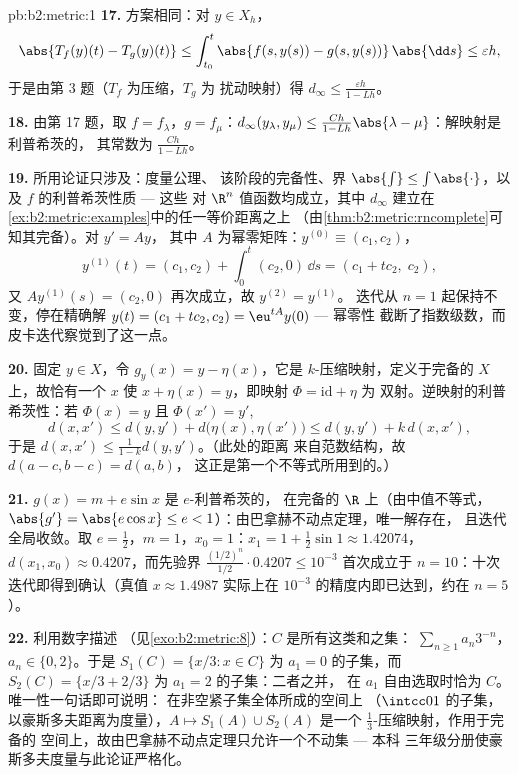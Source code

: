 \begin{solution}{pb:b2:metric:1}
\textbf{17.} 方案相同：对 $y \in X_h$，
\[
\abs{T_f(y)(t) - T_g(y)(t)} \leq \int_{t_0}^t \abs{f(s,y(s)) -
g(s,y(s))}\,\abs{\dd s} \leq \varepsilon h ,
\]
于是由第 3 题（$T_f$ 为压缩，$T_g$ 为
扰动映射）得 $d_\infty \leq \frac{\varepsilon h}{1 - Lh}$。

\textbf{18.} 由第 17 题，取 $f = f_\lambda$，$g =
f_\mu$：$d_\infty(y_\lambda, y_\mu) \leq \frac{Ch}{1 -
Lh}\abs{\lambda - \mu}$：解映射是利普希茨的，
其常数为 $\frac{Ch}{1-Lh}$。

\textbf{19.} 所用论证只涉及：度量公理、
该阶段的完备性、界 $\abs{\int} \leq
\int\abs{\cdot}$，以及 $f$ 的利普希茨性质 --- 这些
对 $\R^n$ 值函数均成立，其中 $d_\infty$ 建立在
\cref{ex:b2:metric:examples}中的任一等价距离之上
（由\cref{thm:b2:metric:rncomplete}可知其完备）。对 $y' = Ay$，
其中 $A$ 为幂零矩阵：$y^{(0)} \equiv (c_1, c_2)$，
\[
y^{(1)}(t) = (c_1, c_2) + \int_0^t (c_2, 0)\,\dd s
= (c_1 + tc_2,\; c_2),
\]
又 $Ay^{(1)}(s) = (c_2, 0)$ 再次成立，故 $y^{(2)} = y^{(1)}$。
迭代从 $n = 1$ 起保持不变，停在精确解
$y(t) = (c_1 + tc_2, c_2) = \eu^{tA}y(0)$ --- 幂零性
截断了指数级数，而皮卡迭代察觉到了这一点。

\textbf{20.} 固定 $y \in X$，令 $g_y(x) = y - \eta(x)$，它是
$k$-压缩映射，定义于完备的 $X$ 上，故恰有一个 $x$
使 $x + \eta(x) = y$，即映射 $\Phi = \mathrm{id} + \eta$ 为
双射。逆映射的利普希茨性：若 $\Phi(x) = y$ 且 $\Phi(x') =
y'$,
\[
d(x, x') \leq d(y, y') + d\bigl(\eta(x), \eta(x')\bigr)
\leq d(y, y') + k\,d(x, x'),
\]
于是 $d(x, x') \leq \frac{1}{1-k}d(y, y')$。（此处的距离
来自范数结构，故 $d(a - c, b - c) = d(a, b)$，
这正是第一个不等式所用到的。）

\textbf{21.} $g(x) = m + e\sin x$ 是 $e$-利普希茨的，
在完备的 $\R$ 上（由中值不等式，$\abs{g'} = \abs{e\cos x}
\leq e < 1$）：由巴拿赫不动点定理，唯一解存在，
且迭代全局收敛。取 $e = \frac12$，$m = 1$，$x_0
= 1$：$x_1 = 1 + \frac12\sin 1 \approx 1.42074$，$d(x_1, x_0)
\approx 0.4207$，而先验界
$\frac{(1/2)^n}{1/2}\cdot 0.4207 \leq 10^{-3}$ 首次成立于
$n = 10$：十次迭代即得到确认（真值 $x \approx
1.4987$ 实际上在 $10^{-3}$ 的精度内即已达到，约在 $n =
5$）。

\textbf{22.} 利用数字描述
（见\cref{exo:b2:metric:8}）：$C$ 是所有这类和之集：
$\sum_{n\geq1}a_n3^{-n}$，$a_n \in \{0, 2\}$。于是 $S_1(C) =
\{x/3 : x \in C\}$ 为 $a_1 = 0$ 的子集，而 $S_2(C) =
\{x/3 + 2/3\}$ 为 $a_1 = 2$ 的子集：二者之并，
在 $a_1$ 自由选取时恰为 $C$。唯一性一句话即可说明：
在非空紧子集全体所成的空间上
（$\intcc01$ 的子集，以豪斯多夫距离为度量），$A \mapsto
S_1(A) \cup S_2(A)$ 是一个 $\frac13$-压缩映射，作用于完备的
空间上，故由巴拿赫不动点定理只允许一个不动集 --- 本科
三年级分册使豪斯多夫度量与此论证严格化。


\end{solution}
